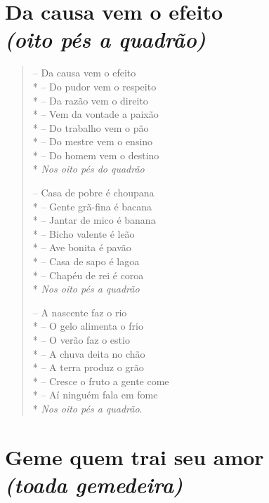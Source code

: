 \chapter[Da causa vem o efeito]{Da causa vem o efeito\\\smallskip\textit{(oito pés a quadrão)}}

\begin{verse}
-- Da causa vem o efeito\\*
-- Do pudor vem o respeito\\*
-- Da razão vem o direito\\*
-- Vem da vontade a paixão\\*
-- Do trabalho vem o pão\\*
-- Do mestre vem o ensino\\*
-- Do homem vem o destino\\*
\textit{Nos oito pés do quadrão}

-- Casa de pobre é choupana\\*
-- Gente grã-fina é bacana\\*
-- Jantar de mico é banana\\*
-- Bicho valente é leão\\*
-- Ave bonita é pavão\\*
-- Casa de sapo é lagoa\\*
-- Chapéu de rei é coroa\\*
\textit{Nos oito pés a quadrão}

-- A nascente faz o rio\\*
-- O gelo alimenta o frio\\*
-- O verão faz o estio\\*
-- A chuva deita no chão\\*
-- A terra produz o grão\\*
-- Cresce o fruto a gente come\\*
-- Aí ninguém fala em fome\\*
\textit{Nos oito pés a quadrão}.
\end{verse}


\chapter[Geme quem trai seu amor]{Geme quem trai seu amor\\\smallskip\textit{(toada gemedeira)}}

